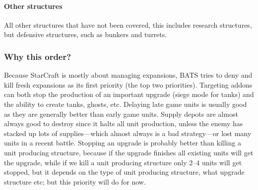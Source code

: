 \paragraph{Other structures \attackCoordinatorWeightsOtherStructure}
All other structures that have not been covered, this includes research structures, but defensive
structures, such as bunkers and turrets.

\subsubsection{Why this order?}
Because StarCraft is mostly about managing expansions\cite{day9}, BATS tries to deny and kill fresh expansions as its first priority (the top two priorities). Targeting addons can both stop the production of an important upgrade (siege mode for tanks) and the ability to create tanks, ghosts, etc. Delaying late game units is usually good as they are generally better than early game units. Supply depots are almost always good to destroy since it halts all unit production, unless the enemy has stacked up lots of supplies—which almost always is a bad strategy—or lost many units in a recent battle. Stopping an upgrade is probably better than killing a unit producing structure, because if the upgrade finishes all existing units will get the upgrade, while if we kill a unit producing structure only 2–4 units will get stopped, but it depends on the type of unit producing structure, what upgrade structure etc; but this priority will do for now.
